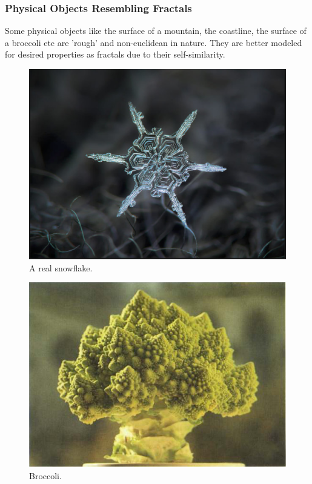 \subsubsection{Physical Objects Resembling Fractals}
Some physical objects like the surface of a mountain, the coastline, the surface
of a broccoli etc are 'rough' and non-euclidean in nature. They are better
modeled for desired properties as fractals due to their self-similarity.
\begin{figure}[h!]
  \includegraphics[width=\linewidth]{Pictures/real_snowflake.png}
  \caption{A real snowflake.}
  \label{fig:real_snowflake}
\end{figure}
\begin{figure}[h!]
  \includegraphics[width=\linewidth]{Pictures/broccoli.png}
  \caption{Broccoli.}
  \label{fig:broccoli}
\end{figure}
